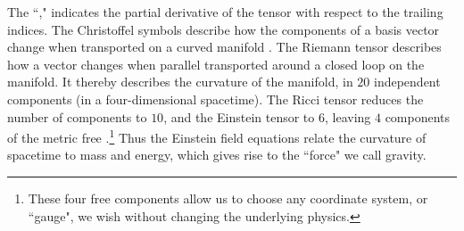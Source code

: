 The ``," indicates the partial derivative of the tensor with respect to the trailing indices. The Christoffel symbols describe how the components of a basis vector change when transported on a curved manifold \cite{Schutz}. The Riemann tensor describes how a vector changes when parallel transported around a closed loop on the manifold. It thereby describes the curvature of the manifold, in $20$ independent components (in a four-dimensional spacetime). The Ricci tensor reduces the number of components to $10$, and the Einstein tensor to $6$, leaving $4$ components of the metric free \cite{BlanfordThorne}.\footnote{These four free components allow us to choose any coordinate system, or ``gauge", we wish without changing the underlying physics.} Thus the Einstein field equations relate the curvature of spacetime to mass and energy, which gives rise to the ``force" we call gravity.

